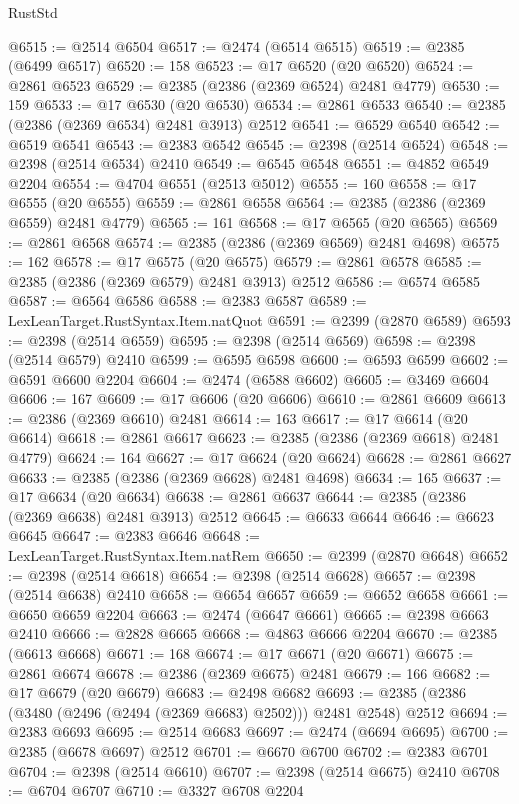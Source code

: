 \begin{lexlean}{RustStd}
\begin{coremodule}
{\begin{coremodule}
{{{{{{{{{{{{{{{{{{{{{{{{{{{{{{{{{{{{{{{{{{{{{{{{{{@6515 := @2514 @6504
@6517 := @2474 (@6514 @6515)
@6519 := @2385 (@6499 @6517)
@6520 := 158
@6523 := @17 @6520 (@20 @6520)
@6524 := @2861 @6523
@6529 := @2385 (@2386 (@2369 @6524) @2481 @4779)
@6530 := 159
@6533 := @17 @6530 (@20 @6530)
@6534 := @2861 @6533
@6540 := @2385 (@2386 (@2369 @6534) @2481 @3913) @2512
@6541 := @6529 @6540
@6542 := @6519 @6541
@6543 := @2383 @6542
@6545 := @2398 (@2514 @6524)
@6548 := @2398 (@2514 @6534) @2410
@6549 := @6545 @6548
@6551 := @4852 @6549 @2204
@6554 := @4704 @6551 (@2513 @5012)
@6555 := 160
@6558 := @17 @6555 (@20 @6555)
@6559 := @2861 @6558
@6564 := @2385 (@2386 (@2369 @6559) @2481 @4779)
@6565 := 161
@6568 := @17 @6565 (@20 @6565)
@6569 := @2861 @6568
@6574 := @2385 (@2386 (@2369 @6569) @2481 @4698)
@6575 := 162
@6578 := @17 @6575 (@20 @6575)
@6579 := @2861 @6578
@6585 := @2385 (@2386 (@2369 @6579) @2481 @3913) @2512
@6586 := @6574 @6585
@6587 := @6564 @6586
@6588 := @2383 @6587
@6589 := LexLeanTarget.RustSyntax.Item.natQuot
@6591 := @2399 (@2870 @6589)
@6593 := @2398 (@2514 @6559)
@6595 := @2398 (@2514 @6569)
@6598 := @2398 (@2514 @6579) @2410
@6599 := @6595 @6598
@6600 := @6593 @6599
@6602 := @6591 @6600 @2204
@6604 := @2474 (@6588 @6602)
@6605 := @3469 @6604
@6606 := 167
@6609 := @17 @6606 (@20 @6606)
@6610 := @2861 @6609
@6613 := @2386 (@2369 @6610) @2481
@6614 := 163
@6617 := @17 @6614 (@20 @6614)
@6618 := @2861 @6617
@6623 := @2385 (@2386 (@2369 @6618) @2481 @4779)
@6624 := 164
@6627 := @17 @6624 (@20 @6624)
@6628 := @2861 @6627
@6633 := @2385 (@2386 (@2369 @6628) @2481 @4698)
@6634 := 165
@6637 := @17 @6634 (@20 @6634)
@6638 := @2861 @6637
@6644 := @2385 (@2386 (@2369 @6638) @2481 @3913) @2512
@6645 := @6633 @6644
@6646 := @6623 @6645
@6647 := @2383 @6646
@6648 := LexLeanTarget.RustSyntax.Item.natRem
@6650 := @2399 (@2870 @6648)
@6652 := @2398 (@2514 @6618)
@6654 := @2398 (@2514 @6628)
@6657 := @2398 (@2514 @6638) @2410
@6658 := @6654 @6657
@6659 := @6652 @6658
@6661 := @6650 @6659 @2204
@6663 := @2474 (@6647 @6661)
@6665 := @2398 @6663 @2410
@6666 := @2828 @6665
@6668 := @4863 @6666 @2204
@6670 := @2385 (@6613 @6668)
@6671 := 168
@6674 := @17 @6671 (@20 @6671)
@6675 := @2861 @6674
@6678 := @2386 (@2369 @6675) @2481
@6679 := 166
@6682 := @17 @6679 (@20 @6679)
@6683 := @2498 @6682
@6693 := @2385 (@2386 (@3480 (@2496 (@2494 (@2369 @6683) @2502))) @2481 @2548) @2512
@6694 := @2383 @6693
@6695 := @2514 @6683
@6697 := @2474 (@6694 @6695)
@6700 := @2385 (@6678 @6697) @2512
@6701 := @6670 @6700
@6702 := @2383 @6701
@6704 := @2398 (@2514 @6610)
@6707 := @2398 (@2514 @6675) @2410
@6708 := @6704 @6707
@6710 := @3327 @6708 @2204
}}}}}}}}}}}}}}}}}}}}}}}}}}}}}}}}}}}}}}}}}}}}}}}}}}
\end{coremodule}}
\end{coremodule}
\end{lexlean}
